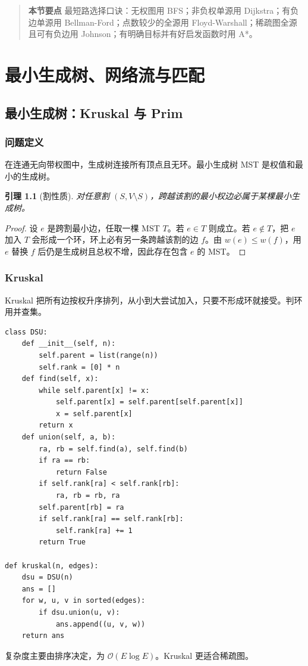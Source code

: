 \documentclass[UTF8,oneside,12pt]{ctexbook}
\newtheorem{lemma}{引理}[chapter]
\newenvironment{summarybox}{\begin{quote}\small\noindent\textbf{本节要点}\quad}{\end{quote}}
\newcommand{\bigO}{\mathcal O}
\begin{document}
\begin{summarybox}
最短路选择口诀：无权图用 BFS；非负权单源用 Dijkstra；有负边单源用 Bellman-Ford；点数较少的全源用 Floyd-Warshall；稀疏图全源且可有负边用 Johnson；有明确目标并有好启发函数时用 A*。
\end{summarybox}

\chapter{最小生成树、网络流与匹配}
\section{最小生成树：Kruskal 与 Prim}
\subsection{问题定义}
在连通无向带权图中，生成树连接所有顶点且无环。最小生成树 MST 是权值和最小的生成树。

\begin{lemma}[割性质]
对任意割 $(S,V\setminus S)$，跨越该割的最小权边必属于某棵最小生成树。
\end{lemma}
\begin{proof}
设 $e$ 是跨割最小边，任取一棵 MST $T$。若 $e\in T$ 则成立。若 $e\notin T$，把 $e$ 加入 $T$ 会形成一个环，环上必有另一条跨越该割的边 $f$。由 $w(e)\le w(f)$，用 $e$ 替换 $f$ 后仍是生成树且总权不增，因此存在包含 $e$ 的 MST。
\end{proof}

\subsection{Kruskal}
Kruskal 把所有边按权升序排列，从小到大尝试加入，只要不形成环就接受。判环用并查集。

\begin{lstlisting}
class DSU:
    def __init__(self, n):
        self.parent = list(range(n))
        self.rank = [0] * n
    def find(self, x):
        while self.parent[x] != x:
            self.parent[x] = self.parent[self.parent[x]]
            x = self.parent[x]
        return x
    def union(self, a, b):
        ra, rb = self.find(a), self.find(b)
        if ra == rb:
            return False
        if self.rank[ra] < self.rank[rb]:
            ra, rb = rb, ra
        self.parent[rb] = ra
        if self.rank[ra] == self.rank[rb]:
            self.rank[ra] += 1
        return True

def kruskal(n, edges):
    dsu = DSU(n)
    ans = []
    for w, u, v in sorted(edges):
        if dsu.union(u, v):
            ans.append((u, v, w))
    return ans
\end{lstlisting}
复杂度主要由排序决定，为 $\bigO(E\log E)$。Kruskal 更适合稀疏图。
\end{document}
